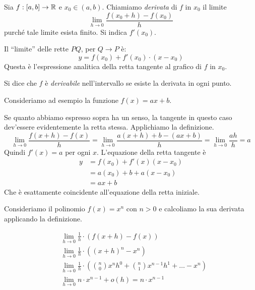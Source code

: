 \begin{definition}
Sia $f: [a, b] \to \mathbb R$ e $x_0 \in (a, b)$. Chiamiamo \emph{derivata} di $f$ in $x_0$ il limite
\begin{equation*}
\lim_{h \to 0} \frac{f(x_0+h)-f(x_0)}{h}
\end{equation*}
purché tale limite esista finito. Si indica $f'(x_0)$.
\end{definition}

Il ``limite'' delle rette $PQ$, per $Q \to P$ è:
\begin{equation*}
y = f(x_0) + f'(x_0) \cdot (x-x_0)
\end{equation*}
Questa è l'espressione analitica della retta tangente al grafico di $f$ in $x_0$.

\begin{definition}
Si dice che $f$ è \emph{derivabile} nell'intervallo se esiste la derivata in ogni punto.
\end{definition}

\begin{example}
Consideriamo ad esempio la funzione $f(x) = ax + b$.

\begin{center}
\end{center}

Se quanto abbiamo espresso sopra ha un senso, la tangente in questo caso dev'essere evidentemente la retta stessa. Applichiamo la definizione.
\begin{equation*}
\lim_{h \to 0} \frac{f(x+h)-f(x)}{h} = \lim_{h \to 0} \frac{a(x+h) + b  - (ax+b)}{h} = \lim_{h \to 0} \frac{ah}{h} = a
\end{equation*}
Quindi $f'(x) = a$ per ogni $x$. L'equazione della retta tangente è
\begin{align*}
y &= f(x_0) + f'(x)(x-x_0) \\
&= a(x_0) + b + a(x-x_0) \\
&= ax + b
\end{align*}
Che è esattamente coincidente all'equazione della retta iniziale.
\end{example}

\begin{example}
Consideriamo il polinomio $f(x) = x^n$ con $n > 0$ e calcoliamo la sua derivata applicando la definizione.

\begin{align*}
&\lim_{h \to 0} \frac{1}{h} \cdot (f(x+h)-f(x)) \\
&\lim_{h \to 0} \frac{1}{h} \cdot ((x+h)^n - x^n) \\
&\lim_{h \to 0} \frac{1}{h} \cdot \left(\binom{n}{0} x^nh^0 + \binom{n}{1} x^{n-1}h^1 + \ldots - x^n \right) \\
&\lim_{h \to 0} n \cdot x^{n-1} + o(h) = n \cdot  x^{n-1}
\end{align*}

\end{example}

